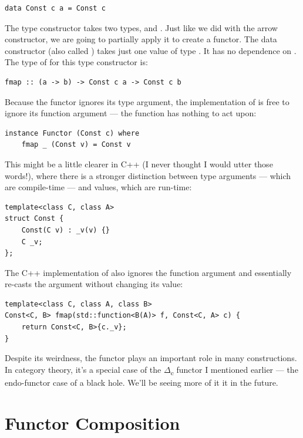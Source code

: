 \begin{Verbatim}[commandchars=\\\{\}]
data Const c a = Const c
\end{Verbatim}
The  type constructor takes two types,  and
. Just like we did with the arrow constructor, we are going to
partially apply it to create a functor. The data constructor (also
called ) takes just one value of type . It has
no dependence on . The type of  for this type
constructor is:

\begin{Verbatim}[commandchars=\\\{\}]
fmap :: (a -> b) -> Const c a -> Const c b
\end{Verbatim}
Because the functor ignores its type argument, the implementation of
 is free to ignore its function argument --- the function
has nothing to act upon:

\begin{Verbatim}[commandchars=\\\{\}]
instance Functor (Const c) where
    fmap _ (Const v) = Const v
\end{Verbatim}
This might be a little clearer in C++ (I never thought I would utter
those words!), where there is a stronger distinction between type
arguments --- which are compile-time --- and values, which are run-time:

\begin{Verbatim}
template<class C, class A>
struct Const { 
    Const(C v) : _v(v) {}
    C _v;
};
\end{Verbatim}
The C++ implementation of  also ignores the function
argument and essentially re-casts the  argument without
changing its value:

\begin{Verbatim}
template<class C, class A, class B>
Const<C, B> fmap(std::function<B(A)> f, Const<C, A> c) {
    return Const<C, B>{c._v};
}
\end{Verbatim}
Despite its weirdness, the  functor plays an important
role in many constructions. In category theory, it's a special case of
the \ensuremath{\Delta}\textsubscript{c} functor I mentioned earlier --- the endo-functor
case of a black hole. We'll be seeing more of it it in the future.

\section{Functor Composition}\label{functor-composition}

